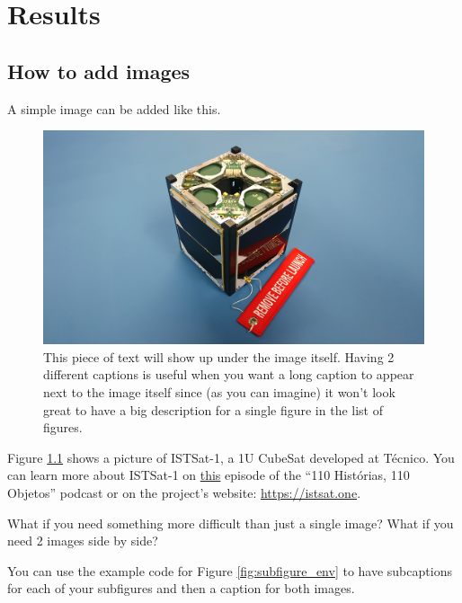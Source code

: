 \chapter{Results}
\label{chapter:results}

\section{How to add images}

A simple image can be added like this.

\begin{figure}[!htb]
	\centering
	
	\includegraphics[width=.5\textwidth]{images/istsat1.jpeg}
	\caption[This piece of text is the image caption that will be shown in the list of tables at the start of the document.]{This piece of text will show up under the image itself. Having 2 different captions is useful when you want a long caption to appear next to the image itself since (as you can imagine) it won't look great to have a big description for a single figure in the list of figures.}
	\label{fig:normal_image}
\end{figure}

Figure \ref{fig:normal_image} shows a picture of ISTSat-1, a 1U CubeSat developed at Técnico. You can learn more about ISTSat-1 on \href{https://110.tecnico.ulisboa.pt/arquivos/episodio-34-istsat-1-o-1-o-cubesat-portugues/}{this} episode of the ``110 Histórias, 110 Objetos'' podcast or on the project's website: \url{https://istsat.one}.

What if you need something more difficult than just a single image? What if you need 2 images side by side? 

You can use the example code for Figure \ref{fig:subfigure_env} to have subcaptions for each of your subfigures and then a caption for both images.

